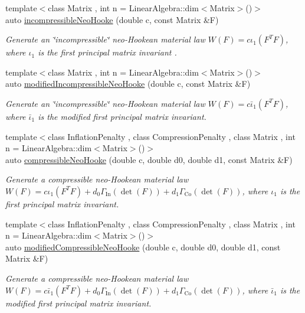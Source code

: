 \begin{DoxyCompactItemize}
{\footnotesize template$<$class Matrix , int n = Linear\-Algebra\-::dim$<$\-Matrix$>$()$>$ }\\auto \hyperlink{group__Rubber_ga5bb28aef7006413775791998936d6b81}{incompressible\-Neo\-Hooke} (double c, const Matrix \&F)
\begin{DoxyCompactList}\small\item\em Generate an \char`\"{}incompressible\char`\"{} neo-\/\-Hookean material law $ W(F)=c\iota_1(F^T F) $, where $\iota_1$ is the first principal matrix invariant . \end{DoxyCompactList}\item 
{\footnotesize template$<$class Matrix , int n = Linear\-Algebra\-::dim$<$\-Matrix$>$()$>$ }\\auto \hyperlink{group__Rubber_gaf6f5ab6a379ef03d513acc5042731a01}{modified\-Incompressible\-Neo\-Hooke} (double c, const Matrix \&F)
\begin{DoxyCompactList}\small\item\em Generate an \char`\"{}incompressible\char`\"{} neo-\/\-Hookean material law $ W(F)=c\bar\iota_1(F^T F) $, where $\bar\iota_1$ is the modified first principal matrix invariant. \end{DoxyCompactList}\item 
{\footnotesize template$<$class Inflation\-Penalty , class Compression\-Penalty , class Matrix , int n = Linear\-Algebra\-::dim$<$\-Matrix$>$()$>$ }\\auto \hyperlink{group__Rubber_gac5c39cd9de55f4f0220a806cf28a7b30}{compressible\-Neo\-Hooke} (double c, double d0, double d1, const Matrix \&F)
\begin{DoxyCompactList}\small\item\em Generate a compressible neo-\/\-Hookean material law $ W(F)=c\iota_1(F^T F)+d_0\Gamma_\mathrm{In}(\det(F))+d_1\Gamma_\mathrm{Co}(\det(F)) $, where $\iota_1$ is the first principal matrix invariant. \end{DoxyCompactList}\item 
{\footnotesize template$<$class Inflation\-Penalty , class Compression\-Penalty , class Matrix , int n = Linear\-Algebra\-::dim$<$\-Matrix$>$()$>$ }\\auto \hyperlink{group__Rubber_gac10942df03f037afdf0a81d330361a6b}{modified\-Compressible\-Neo\-Hooke} (double c, double d0, double d1, const Matrix \&F)
\begin{DoxyCompactList}\small\item\em Generate a compressible neo-\/\-Hookean material law $ W(F)=c\bar\iota_1(F^T F)+d_0\Gamma_\mathrm{In}(\det(F))+d_1\Gamma_\mathrm{Co}(\det(F)) $, where $\bar\iota_1$ is the modified first principal matrix invariant. \end{DoxyCompactList}\item 

\end{DoxyCompactItemize}
